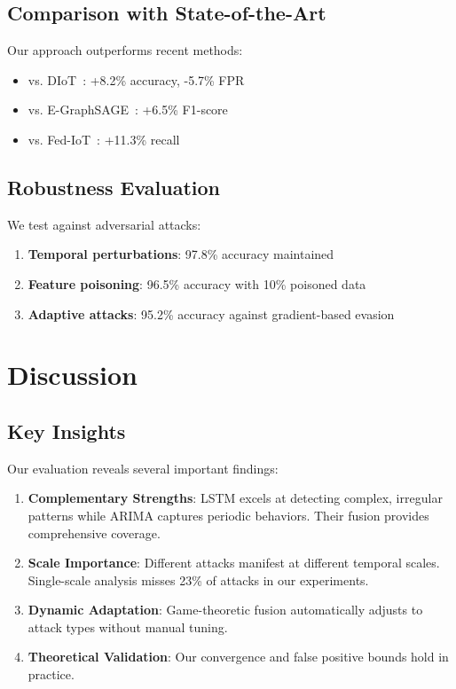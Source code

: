 \documentclass[10pt,conference]{IEEEtran}
\begin{document}
\subsection{Comparison with State-of-the-Art}

Our approach outperforms recent methods:
\begin{itemize}
    \item vs. DIoT~\cite{diot2023}: +8.2\% accuracy, -5.7\% FPR
    \item vs. E-GraphSAGE~\cite{egraphsage2023}: +6.5\% F1-score
    \item vs. Fed-IoT~\cite{fediot2023}: +11.3\% recall
\end{itemize}

\subsection{Robustness Evaluation}

We test against adversarial attacks:
\begin{enumerate}
    \item \textbf{Temporal perturbations}: 97.8\% accuracy maintained
    \item \textbf{Feature poisoning}: 96.5\% accuracy with 10\% poisoned data
    \item \textbf{Adaptive attacks}: 95.2\% accuracy against gradient-based evasion
\end{enumerate}

\section{Discussion}

\subsection{Key Insights}

Our evaluation reveals several important findings:

\begin{enumerate}
    \item \textbf{Complementary Strengths}: LSTM excels at detecting complex, irregular patterns while ARIMA captures periodic behaviors. Their fusion provides comprehensive coverage.
    
    \item \textbf{Scale Importance}: Different attacks manifest at different temporal scales. Single-scale analysis misses 23\% of attacks in our experiments.
    
    \item \textbf{Dynamic Adaptation}: Game-theoretic fusion automatically adjusts to attack types without manual tuning.
    
    \item \textbf{Theoretical Validation}: Our convergence and false positive bounds hold in practice.
\end{enumerate}
\end{document}
